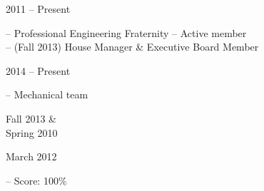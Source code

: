 

\flushleft \begin{minipage}[t]{\dateColWidth}
2011 -- Present
\end{minipage}
\begin{minipage}[t]{10 em}
\end{minipage}
\begin{minipage}[t]{0.6\textwidth} 
-- Professional Engineering Fraternity -- Active member \\
-- (Fall 2013) House Manager \& Executive Board Member
\end{minipage}

\flushleft \begin{minipage}[t]{\dateColWidth}
2014 -- Present
\end{minipage}
\begin{minipage}[t]{0.8\textwidth}
 -- Mechanical team
\end{minipage}

\flushleft \begin{minipage}[t]{\dateColWidth}
Fall 2013 \& \\
Spring 2010
\end{minipage}
\begin{minipage}[t]{0.8\textwidth}
\end{minipage}

\flushleft \begin{minipage}[t]{\dateColWidth}
March 2012
\end{minipage}
\begin{minipage}[t]{0.8\textwidth}
 -- Score: 100\%
\end{minipage}